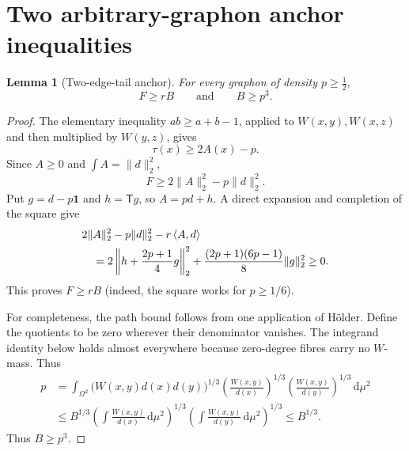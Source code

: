\documentclass[11pt]{article}
\newtheorem{lemma}[theorem]{Lemma}
\newcommand{\dd}{\,\mathrm d}
\newcommand{\one}{\mathbf 1}
\newcommand{\ip}[2]{\left\langle #1,#2\right\rangle}
\newcommand{\TT}{\mathsf T}
\begin{document}
\section{Two arbitrary-graphon anchor inequalities}

\begin{lemma}[Two-edge-tail anchor]
\label{lem:anchor}
For every graphon of density $p\geq\tfrac12$,
\begin{equation}
 F\geq rB
 \qquad\text{and}\qquad
 B\geq p^3.
 \label{eq:anchors}
\end{equation}
\end{lemma}

\begin{proof}
The elementary inequality $ab\geq a+b-1$, applied to
$W(x,y),W(x,z)$ and then multiplied by $W(y,z)$, gives
\begin{equation}
 \tau(x)\geq2A(x)-p.
 \label{eq:rooted-goodman}
\end{equation}
Since $A\geq0$ and $\int A=\lVert d\rVert_2^2$,
\[
 F\geq2\lVert A\rVert_2^2-p\lVert d\rVert_2^2.
\]
Put $g=d-p\one$ and $h=\TT g$, so $A=pd+h$.  A direct expansion and
completion of the square give
\begin{align}
 &2\lVert A\rVert_2^2-p\lVert d\rVert_2^2-r\ip Ad \notag\\
 &\quad=
 2\left\lVert h+\frac{2p+1}{4}g\right\rVert_2^2
 +\frac{(2p+1)(6p-1)}8\lVert g\rVert_2^2\geq0.
 \label{eq:anchor-square}
\end{align}
This proves $F\geq rB$ (indeed, the square works for $p\geq1/6$).

For completeness, the path bound follows from one application of
H\"older.  Define the quotients to be zero wherever their denominator
vanishes.  The integrand identity below holds almost everywhere because
zero-degree fibres carry no $W$-mass.  Thus
\begin{align*}
 p
 &=\int_{\Omega^2}
   \bigl(W(x,y)d(x)d(y)\bigr)^{1/3}
   \left(\frac{W(x,y)}{d(x)}\right)^{1/3}
   \left(\frac{W(x,y)}{d(y)}\right)^{1/3}\dd\mu^2\\
 &\leq B^{1/3}
 \left(\int\frac{W(x,y)}{d(x)}\dd\mu^2\right)^{1/3}
 \left(\int\frac{W(x,y)}{d(y)}\dd\mu^2\right)^{1/3}
 \leq B^{1/3}.
\end{align*}
Thus $B\geq p^3$.
\end{proof}


\end{document}
